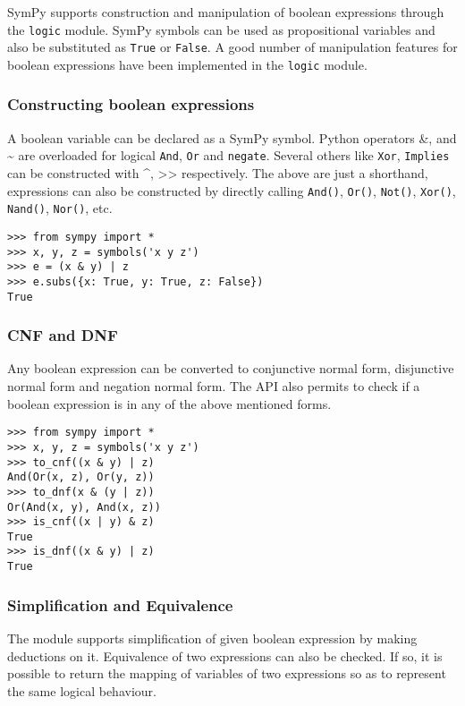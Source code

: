 
SymPy supports construction and manipulation of boolean expressions
through the \texttt{logic} module. SymPy symbols can be used as 
propositional variables and also be substituted as \texttt{True} 
or \texttt{False}. A good number of manipulation features for boolean 
expressions have been implemented in the \texttt{logic} module.

\subsubsection{Constructing boolean expressions}

A boolean variable can be declared as a SymPy symbol. Python
operators \&, \textbar{} and \textasciitilde{} are overloaded for logical \texttt{And}, 
\texttt{Or} and \texttt{negate}. Several others like \texttt{Xor},
\texttt{Implies} can be constructed with \^{}, \textgreater\textgreater{} respectively.  
The above are just a shorthand, expressions can also be constructed
by directly calling \texttt{And()}, \texttt{Or()}, \texttt{Not()},
\texttt{Xor()}, \texttt{Nand()}, \texttt{Nor()}, etc.

\begin{verbatim}
>>> from sympy import *
>>> x, y, z = symbols('x y z')
>>> e = (x & y) | z
>>> e.subs({x: True, y: True, z: False})
True
\end{verbatim}

\subsubsection{CNF and DNF}

Any boolean expression can be converted to conjunctive normal 
form, disjunctive normal form and negation normal form. The 
API also permits to check if a boolean expression is in any 
of the above mentioned forms.

\begin{verbatim}
>>> from sympy import *
>>> x, y, z = symbols('x y z')
>>> to_cnf((x & y) | z)
And(Or(x, z), Or(y, z))
>>> to_dnf(x & (y | z))
Or(And(x, y), And(x, z))
>>> is_cnf((x | y) & z)
True
>>> is_dnf((x & y) | z) 
True
\end{verbatim}

\subsubsection{Simplification and Equivalence}

The module supports simplification of given boolean expression
by making deductions on it. Equivalence of two expressions can
also be checked. If so, it is possible to return the mapping of 
variables of two expressions so as to represent the 
same logical behaviour.

